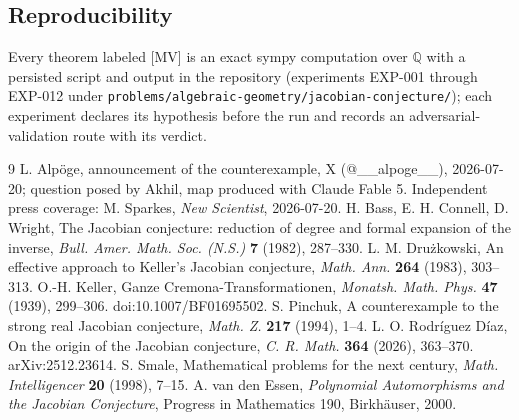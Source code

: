 \documentclass[11pt]{article}
\theoremstyle{definition}
\theoremstyle{remark}
\newcommand{\Q}{\mathbb{Q}}
\begin{document}
\subsection*{Reproducibility}
Every theorem labeled [MV] is an exact sympy computation over $\Q$ with a persisted script and
output in the repository (experiments EXP-001 through EXP-012 under
\texttt{problems/algebraic-geometry/jacobian-conjecture/}); each experiment declares its
hypothesis before the run and records an adversarial-validation route with its verdict.

\begin{thebibliography}{9}
 L. Alp\"oge, announcement of the counterexample, X (@\_\_alpoge\_\_),
2026-07-20; question posed by Akhil, map produced with Claude Fable 5. Independent press
coverage: M. Sparkes, \emph{New Scientist}, 2026-07-20.
 H. Bass, E. H. Connell, D. Wright, The Jacobian conjecture: reduction of
degree and formal expansion of the inverse, \emph{Bull. Amer. Math. Soc. (N.S.)} \textbf{7}
(1982), 287--330.
 L. M. Dru\.zkowski, An effective approach to Keller's Jacobian
conjecture, \emph{Math. Ann.} \textbf{264} (1983), 303--313.
 O.-H. Keller, Ganze Cremona-Transformationen, \emph{Monatsh. Math. Phys.}
\textbf{47} (1939), 299--306. doi:10.1007/BF01695502.
 S. Pinchuk, A counterexample to the strong real Jacobian conjecture,
\emph{Math. Z.} \textbf{217} (1994), 1--4.
 L. O. Rodr\'iguez D\'iaz, On the origin of the Jacobian conjecture,
\emph{C. R. Math.} \textbf{364} (2026), 363--370. arXiv:2512.23614.
 S. Smale, Mathematical problems for the next century, \emph{Math.
Intelligencer} \textbf{20} (1998), 7--15.
 A. van den Essen, \emph{Polynomial Automorphisms and the Jacobian
Conjecture}, Progress in Mathematics 190, Birkh\"auser, 2000.
\end{thebibliography}
\end{document}
